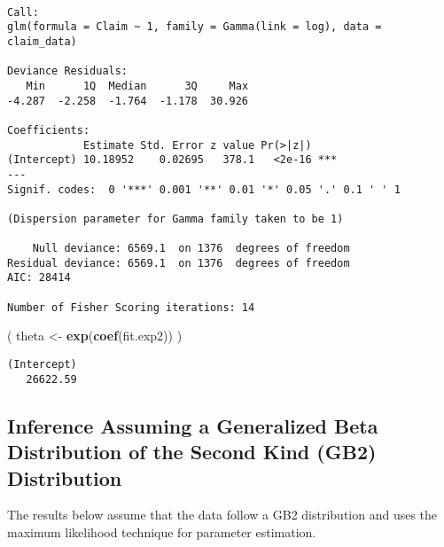 \documentclass[]{book}
\newenvironment{Shaded}{\begin{snugshade}}{\end{snugshade}}
\newcommand{\KeywordTok}[1]{\textcolor[rgb]{0.13,0.29,0.53}{\textbf{#1}}}
\newcommand{\StringTok}[1]{\textcolor[rgb]{0.31,0.60,0.02}{#1}}
\newcommand{\NormalTok}[1]{#1}
\theoremstyle{definition}
\theoremstyle{definition}
\theoremstyle{definition}
\theoremstyle{remark}
\begin{document}
\begin{verbatim}

Call:
glm(formula = Claim ~ 1, family = Gamma(link = log), data = claim_data)

Deviance Residuals: 
   Min      1Q  Median      3Q     Max  
-4.287  -2.258  -1.764  -1.178  30.926  

Coefficients:
            Estimate Std. Error z value Pr(>|z|)    
(Intercept) 10.18952    0.02695   378.1   <2e-16 ***
---
Signif. codes:  0 '***' 0.001 '**' 0.01 '*' 0.05 '.' 0.1 ' ' 1

(Dispersion parameter for Gamma family taken to be 1)

    Null deviance: 6569.1  on 1376  degrees of freedom
Residual deviance: 6569.1  on 1376  degrees of freedom
AIC: 28414

Number of Fisher Scoring iterations: 14
\end{verbatim}

\begin{Shaded}
\begin{Highlighting}[]
\NormalTok{( theta <-}\StringTok{ }\KeywordTok{exp}\NormalTok{(}\KeywordTok{coef}\NormalTok{(fit.exp2)) )  }
\end{Highlighting}
\end{Shaded}

\begin{verbatim}
(Intercept) 
   26622.59 
\end{verbatim}

\subsection{Inference Assuming a Generalized Beta Distribution of the
Second Kind (GB2)
Distribution}\label{inference-assuming-a-generalized-beta-distribution-of-the-second-kind-gb2-distribution}

The results below assume that the data follow a GB2 distribution and
uses the maximum likelihood technique for parameter estimation.
\end{document}
